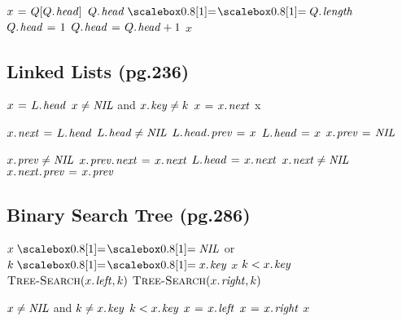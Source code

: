 \documentclass[twocolumn]{article}
\begin{document}
\begin{codebox}
\li $x \gets Q[\attrib{Q}{head}]$
\li \If $\attrib{Q}{head} \isequal \attrib{Q}{length}$
\li \Then $\attrib{Q}{head} \gets 1$
\li \Else $\attrib{Q}{head} \gets \attrib{Q}{head} + 1$
	\End
\li \Return $x$
\end{codebox}

\subsection{Linked Lists (pg.236)}
\begin{codebox}
\li $x \gets \attrib{L}{head}$
\li \While $x \neq \id{NIL}$ and $\attrib{x}{key} \neq k$
\li \Do $x \gets \attrib{x}{next}$
	\End
\li \Return x
\end{codebox}

\begin{codebox}
\li $\attrib{x}{next} \gets \attrib{L}{head}$
\li \If $\attrib{L}{head} \neq \id{NIL}$
\li \Then $\attribb{L}{head}{prev} \gets x$
	\End
\li $\attrib{L}{head} \gets x$
\li $\attrib{x}{prev} \gets \id{NIL}$
\end{codebox}

\begin{codebox}
\li \If $\attrib{x}{prev} \neq \id{NIL}$
\li \Then $\attribb{x}{prev}{next} \gets \attrib{x}{next}$
\li \Else $\attrib{L}{head} \gets \attrib{x}{next}$
	\End
\li \If $\attrib{x}{next} \neq \id{NIL}$
\li \Then $\attribb{x}{next}{prev} \gets \attrib{x}{prev}$
	\End
\end{codebox}

\subsection{Binary Search Tree (pg.286)}
\begin{codebox}
\li \If $x \isequal \id{NIL}$ or $k \isequal \attrib{x}{key}$
\li \Then \Return $x$
	\End
\li \If $k < \attrib{x}{key}$
\li \Then \Return $\proc{Tree-Search}(\attrib{x}{left},k)$
\li \Else \Return $\proc{Tree-Search}(\attrib{x}{right},k)$
	\End
\end{codebox}

\begin{codebox}
\li \While $x \neq \id{NIL}$ and $k \neq \attrib{x}{key}$
\li \Do \If $k < \attrib{x}{key}$
\li 		\Then $x \gets \attrib{x}{left}$
\li 		\Else $x \gets \attrib{x}{right}$
		\End
	\End
\li \Return $x$
\end{codebox}
\end{document}
